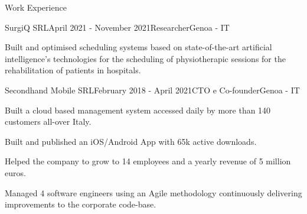 \documentclass{resume} %
\begin{document}
\begin{comment}
	\begin{rSection}{Projects}

- Master's Degree Thesis: "\textbf{Artificial Intelligence Techniques for Solving the In-Station Train Dispatching Problem}" Supervisors: Prof. M. Maratea, Dr. M. Vallati (University of Huddersfield)\\
- Research scholarship \textit{Post-Laurea} on "\textbf{Induction and Deduction for Train Dispatching in Small/Medium Stations.}" at DIBRIS - Universita' degli Studi di Genova (D.R. n. 1346) \\
- Bachelor's Degree Thesis: "\textbf{Visual and Data Analytics for the Analysis of Train Flows in the Railway Network.}" Supervisors: Prof. M. Maratea, Prof. L. Oneto
	
\end{rSection}
\end{comment}



\begin{rSection}{Work Experience}


\begin{rSubsection}{SurgiQ SRL}{April 2021 - November 2021}{Researcher}{Genoa - IT}
\item Built and optimised scheduling systems based on state-of-the-art artificial intelligence's technologies for the scheduling of physiotherapic sessions for the rehabilitation of patients in hospitals.
\end{rSubsection}

\begin{rSubsection}{Secondhand Mobile SRL}{February 2018 - April 2021}{CTO e Co-founder}{Genoa - IT}
\item Built a cloud based management system accessed daily by more than 140 customers all-over Italy. 
\item Built and published an iOS/Android App with 65k active downloads. 
\item Helped the company to grow to 14 employees and a yearly revenue of 5 million euros. 
\item Managed 4 software engineers using an Agile methodology continuously delivering improvements to the corporate code-base.
\end{rSubsection}




\end{rSection}



\end{document}
